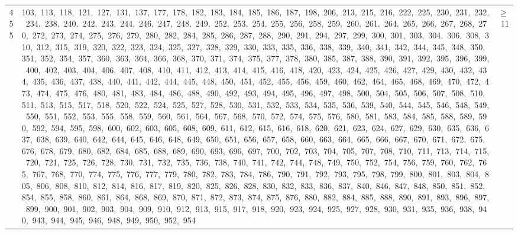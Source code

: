 \begin{longtable}{c|p{}|r}
455 & 103,\ 113,\ 118,\ 121,\ 127,\ 131,\ 137,\ 177,\ 178,\ 182,\ 183,\ 184,\ 185,\ 186,\ 187,\ 198,\ 206,\ 213,\ 215,\ 216,\ 222,\ 225,\ 230,\ 231,\ 232,\ 234,\ 238,\ 240,\ 242,\ 243,\ 244,\ 246,\ 247,\ 248,\ 249,\ 252,\ 253,\ 254,\ 255,\ 256,\ 258,\ 259,\ 260,\ 261,\ 264,\ 265,\ 266,\ 267,\ 268,\ 270,\ 272,\ 273,\ 274,\ 275,\ 276,\ 279,\ 280,\ 282,\ 284,\ 285,\ 286,\ 287,\ 288,\ 290,\ 291,\ 294,\ 297,\ 299,\ 300,\ 301,\ 303,\ 304,\ 306,\ 308,\ 310,\ 312,\ 315,\ 319,\ 320,\ 322,\ 323,\ 324,\ 325,\ 327,\ 328,\ 329,\ 330,\ 333,\ 335,\ 336,\ 338,\ 339,\ 340,\ 341,\ 342,\ 344,\ 345,\ 348,\ 350,\ 351,\ 352,\ 354,\ 357,\ 360,\ 363,\ 364,\ 366,\ 368,\ 370,\ 371,\ 374,\ 375,\ 377,\ 378,\ 380,\ 385,\ 387,\ 388,\ 390,\ 391,\ 392,\ 395,\ 396,\ 399,\ 400,\ 402,\ 403,\ 404,\ 406,\ 407,\ 408,\ 410,\ 411,\ 412,\ 413,\ 414,\ 415,\ 416,\ 418,\ 420,\ 423,\ 424,\ 425,\ 426,\ 427,\ 429,\ 430,\ 432,\ 434,\ 435,\ 436,\ 437,\ 438,\ 440,\ 441,\ 442,\ 444,\ 445,\ 448,\ 450,\ 451,\ 452,\ 455,\ 456,\ 459,\ 460,\ 462,\ 464,\ 465,\ 468,\ 469,\ 470,\ 472,\ 473,\ 474,\ 475,\ 476,\ 480,\ 481,\ 483,\ 484,\ 486,\ 488,\ 490,\ 492,\ 493,\ 494,\ 495,\ 496,\ 497,\ 498,\ 500,\ 504,\ 505,\ 506,\ 507,\ 508,\ 510,\ 511,\ 513,\ 515,\ 517,\ 518,\ 520,\ 522,\ 524,\ 525,\ 527,\ 528,\ 530,\ 531,\ 532,\ 533,\ 534,\ 535,\ 536,\ 539,\ 540,\ 544,\ 545,\ 546,\ 548,\ 549,\ 550,\ 551,\ 552,\ 553,\ 555,\ 558,\ 559,\ 560,\ 561,\ 564,\ 567,\ 568,\ 570,\ 572,\ 574,\ 575,\ 576,\ 580,\ 581,\ 583,\ 584,\ 585,\ 588,\ 589,\ 590,\ 592,\ 594,\ 595,\ 598,\ 600,\ 602,\ 603,\ 605,\ 608,\ 609,\ 611,\ 612,\ 615,\ 616,\ 618,\ 620,\ 621,\ 623,\ 624,\ 627,\ 629,\ 630,\ 635,\ 636,\ 637,\ 638,\ 639,\ 640,\ 642,\ 644,\ 645,\ 646,\ 648,\ 649,\ 650,\ 651,\ 656,\ 657,\ 658,\ 660,\ 663,\ 664,\ 665,\ 666,\ 667,\ 670,\ 671,\ 672,\ 675,\ 676,\ 678,\ 679,\ 680,\ 682,\ 684,\ 685,\ 688,\ 689,\ 690,\ 693,\ 696,\ 697,\ 700,\ 702,\ 703,\ 704,\ 705,\ 707,\ 708,\ 710,\ 711,\ 713,\ 714,\ 715,\ 720,\ 721,\ 725,\ 726,\ 728,\ 730,\ 731,\ 732,\ 735,\ 736,\ 738,\ 740,\ 741,\ 742,\ 744,\ 748,\ 749,\ 750,\ 752,\ 754,\ 756,\ 759,\ 760,\ 762,\ 765,\ 767,\ 768,\ 770,\ 774,\ 775,\ 776,\ 777,\ 779,\ 780,\ 782,\ 783,\ 784,\ 786,\ 790,\ 791,\ 792,\ 793,\ 795,\ 798,\ 799,\ 800,\ 801,\ 803,\ 804,\ 805,\ 806,\ 808,\ 810,\ 812,\ 814,\ 816,\ 817,\ 819,\ 820,\ 825,\ 826,\ 828,\ 830,\ 832,\ 833,\ 836,\ 837,\ 840,\ 846,\ 847,\ 848,\ 850,\ 851,\ 852,\ 854,\ 855,\ 858,\ 860,\ 861,\ 864,\ 868,\ 869,\ 870,\ 871,\ 872,\ 873,\ 874,\ 875,\ 876,\ 880,\ 882,\ 884,\ 885,\ 888,\ 890,\ 891,\ 893,\ 896,\ 897,\ 899,\ 900,\ 901,\ 902,\ 903,\ 904,\ 909,\ 910,\ 912,\ 913,\ 915,\ 917,\ 918,\ 920,\ 923,\ 924,\ 925,\ 927,\ 928,\ 930,\ 931,\ 935,\ 936,\ 938,\ 940,\ 943,\ 944,\ 945,\ 946,\ 948,\ 949,\ 950,\ 952,\ 954 & $\ge$ 11 \\

\end{longtable}
